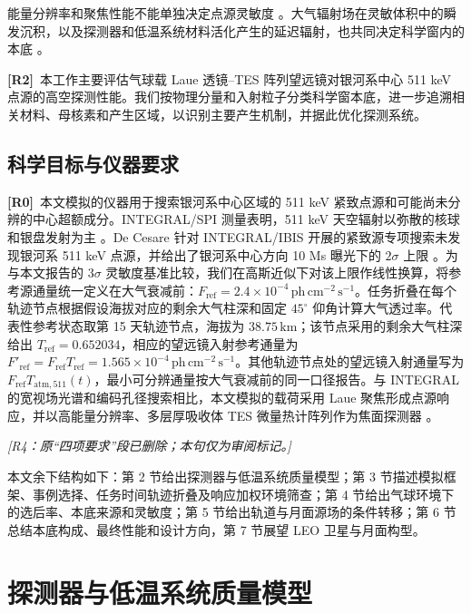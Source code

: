\documentclass[11pt]{article}
\newcommand{\revmark}[1]{\textcolor{revisionblue}{\textbf{[R#1]}}\ }
\newcommand{\revdeleted}[1]{\par\noindent\textcolor{revisionblue}{\small\itshape [#1]}\par}
\newcommand{\phcms}{\,\mathrm{ph\,cm^{-2}\,s^{-1}}}
\newcommand{\fref}{F_{\mathrm{ref}}}
\begin{document}
能量分辨率和聚焦性能不能单独决定点源灵敏度 \cite{Shirazi2023,Hu2026}。大气辐射场在灵敏体积中的瞬发沉积，以及探测器和低温系统材料活化产生的延迟辐射，也共同决定科学窗内的本底 \cite{Gallego2025Balloon,Tian2026DIXE}。

\revmark{2}本工作主要评估气球载 Laue 透镜--TES 阵列望远镜对银河系中心 511 keV 点源的高空探测性能。我们按物理分量和入射粒子分类科学窗本底，进一步追溯相关材料、母核素和产生区域，以识别主要产生机制，并据此优化探测系统。

\subsection{科学目标与仪器要求}
\label{sec:requirements}

\begingroup
{}

\revmark{0}本文模拟的仪器用于搜索银河系中心区域的 511 keV 紧致点源和可能尚未分辨的中心超额成分。INTEGRAL/SPI 测量表明，511 keV 天空辐射以弥散的核球和银盘发射为主 \cite{Siegert2016AA,Yoneda2025}。De Cesare 针对 INTEGRAL/IBIS 开展的紧致源专项搜索未发现银河系 511 keV 点源，并给出了银河系中心方向 10 Ms 曝光下的 $2\sigma$ 上限 \cite{DeCesare2011}。为与本文报告的 $3\sigma$ 灵敏度基准比较，我们在高斯近似下对该上限作线性换算，将参考源通量统一定义在大气衰减前：$\fref=2.4\times10^{-4}\phcms$。任务折叠在每个轨迹节点根据假设海拔对应的剩余大气柱深和固定 $45^\circ$ 仰角计算大气透过率。代表性参考状态取第 15 天轨迹节点，海拔为 $38.75\,\mathrm{km}$；该节点采用的剩余大气柱深给出 $T_{\mathrm{ref}}=0.652034$，相应的望远镜入射参考通量为 $F'_{\mathrm{ref}}=\fref T_{\mathrm{ref}}=1.565\times10^{-4}\phcms$。其他轨迹节点处的望远镜入射通量写为 $\fref T_{\mathrm{atm},511}(t)$，最小可分辨通量按大气衰减前的同一口径报告。与 INTEGRAL 的宽视场光谱和编码孔径搜索相比，本文模拟的载荷采用 Laue 聚焦形成点源响应，并以高能量分辨率、多层厚吸收体 TES 微量热计阵列作为焦面探测器 \cite{Shirazi2023,Caputo2017}。

\revdeleted{R4：原“四项要求”段已删除；本句仅为审阅标记。}

本文余下结构如下：第 2 节给出探测器与低温系统质量模型；第 3 节描述模拟框架、事例选择、任务时间轨迹折叠及响应加权环境筛查；第 4 节给出气球环境下的选后率、本底来源和灵敏度；第 5 节给出轨道与月面源场的条件转移；第 6 节总结本底构成、最终性能和设计方向，第 7 节展望 LEO 卫星与月面构型。

\endgroup

\section{探测器与低温系统质量模型}
\label{sec:geometry}
\end{document}
